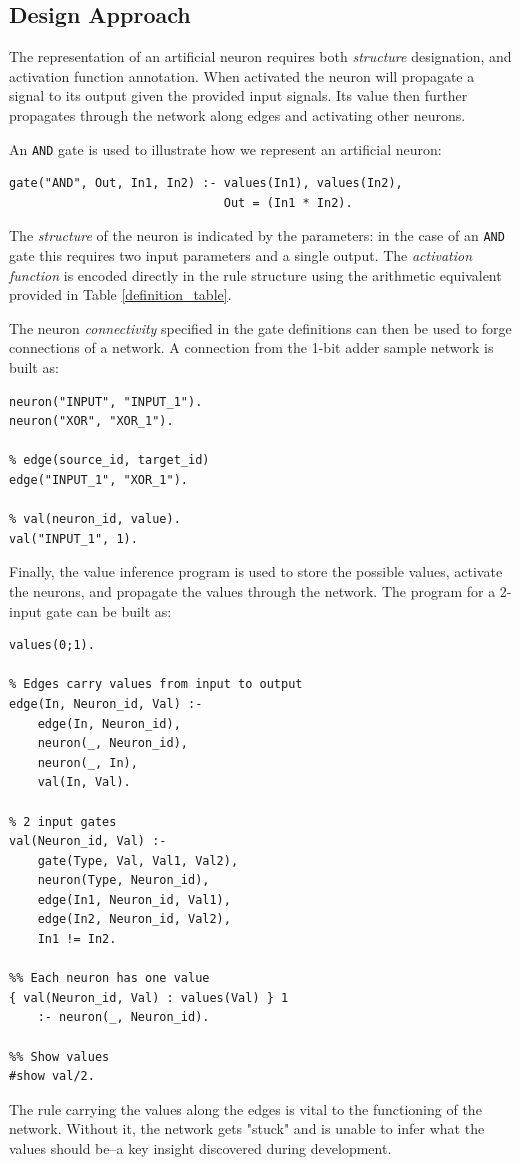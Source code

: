 \subsection{Design Approach}

The representation of an artificial neuron requires both \emph{structure} designation, and activation function annotation. When activated the neuron will propagate a signal to its output given the provided input signals. Its value then further propagates through the network along edges and activating other neurons.

An {\tt AND} gate is used to illustrate how we represent an artificial neuron:
\begin{lstlisting}[basicstyle=\ttfamily\small]
% gate(TYPE, OUTPUT, INPUTS)
gate("AND", Out, In1, In2) :- values(In1), values(In2),
                              Out = (In1 * In2).
\end{lstlisting}

The \emph{structure} of the neuron is indicated by the parameters: in the case of an {\tt AND} gate this requires two input parameters and a single output. The \emph{activation function} is encoded directly in the rule structure using the arithmetic equivalent provided in Table \ref{definition_table}.

The neuron \emph{connectivity} specified in the gate definitions can then be used to forge connections of a network. A connection from the 1-bit adder sample network is built as:
\begin{lstlisting}[basicstyle=\ttfamily\small]
% neuron(type, unique_id)
neuron("INPUT", "INPUT_1").
neuron("XOR", "XOR_1").

% edge(source_id, target_id)
edge("INPUT_1", "XOR_1").

% val(neuron_id, value).
val("INPUT_1", 1).
\end{lstlisting}

Finally, the value inference program is used to store the possible values, activate the neurons, and propagate the values through the network. The program for a 2-input gate can be built as:
\begin{lstlisting}[basicstyle=\ttfamily\small]
%% Value domain
values(0;1).

% Edges carry values from input to output
edge(In, Neuron_id, Val) :-
    edge(In, Neuron_id),
    neuron(_, Neuron_id),
    neuron(_, In),
    val(In, Val).

% 2 input gates
val(Neuron_id, Val) :-
    gate(Type, Val, Val1, Val2),
    neuron(Type, Neuron_id),
    edge(In1, Neuron_id, Val1),
    edge(In2, Neuron_id, Val2),
    In1 != In2.

%% Each neuron has one value
{ val(Neuron_id, Val) : values(Val) } 1
    :- neuron(_, Neuron_id).

%% Show values
#show val/2.
\end{lstlisting}

The rule carrying the values along the edges is vital to the functioning of the network. Without it, the network gets "stuck" and is unable to infer what the values should be--a key insight discovered during development.
